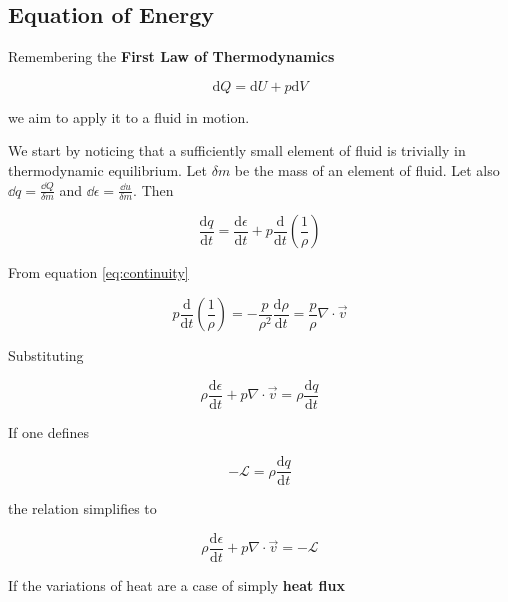 \documentclass{article}
\begin{document}
\subsection{Equation of Energy}

Remembering the \textbf{First Law of Thermodynamics}

\begin{equation}
  \label{eq:3rd_law_thermo}
  \mathrm{d} Q=\mathrm{d} U+p \mathrm{d} V
\end{equation}

we aim to apply it to a fluid in motion.

We start by noticing that a sufficiently small element of fluid is trivially in
thermodynamic equilibrium. Let $\delta m$ be the mass of an element of fluid.
Let also $\dd{q} = \frac{ \dd{Q} }{\delta m}$ and $\dd{\epsilon} =
\frac{\dd{u}}{\delta m}$. Then

\begin{equation*}
  \frac{\mathrm{d} q}{\mathrm{d} t}=\frac{\mathrm{d} \epsilon}{\mathrm{d} t}+p \frac{\mathrm{d}}{\mathrm{d} t}\left(\frac{1}{\rho}\right)
\end{equation*}

From equation \ref{eq:continuity}

\begin{equation*}
  p \frac{\mathrm{d}}{\mathrm{d} t}\left(\frac{1}{\rho}\right)=  -\frac{p}{\rho^{2}} \frac{\mathrm{d} \rho}{\mathrm{d} t} =  \frac{p}{\rho} \nabla \cdot \vec{v} 
\end{equation*}

Substituting

\begin{equation*}
  \rho \frac{\mathrm{d} \epsilon}{\mathrm{d} t}+p \nabla \cdot \vec{v}=\rho \frac{\mathrm{d} q}{\mathrm{d} t}
\end{equation*}

If one defines

\begin{equation}
  \label{eq:L_energy}
  -\mathcal{L}=\rho \frac{\mathrm{d} q}{\mathrm{d} t}
\end{equation}

the relation simplifies to

\begin{equation}
  \label{eq:energy}
  \rho \frac{\mathrm{d} \epsilon}{\mathrm{d} t}+p \nabla \cdot \vec{v}=-\mathcal{L}
\end{equation}

If the variations of heat are a case of simply \textbf{heat flux}
\end{document}
